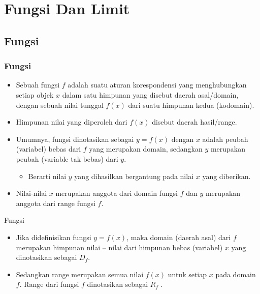 \documentclass[pdflatex,compress,mathserif]{beamer}
\begin{document}
\section{Fungsi Dan Limit}

	\subsection{Fungsi}
	
		\begin{frame}
			\frametitle{Fungsi}
			\begin{itemize}
				\item Sebuah fungsi $ f $ adalah suatu aturan korespondensi yang menghubungkan setiap objek $ x $ dalam satu himpunan yang disebut daerah asal/domain, dengan sebuah nilai tunggal $ f(x) $ dari suatu himpunan kedua (kodomain).
				\item Himpunan nilai yang diperoleh dari $ f(x) $ disebut daerah hasil/range.
				\item Umumnya, fungsi dinotasikan sebagai $ y = f(x) $ dengan $ x $ adalah peubah (variabel) bebas dari $ f $ yang merupakan domain, sedangkan $ y $ merupakan peubah (variable tak bebas) dari $ y $.
				\begin{itemize}
					\item Berarti nilai $ y $ yang dihasilkan bergantung pada nilai $ x $ yang diberikan.
				\end{itemize}
				\item Nilai-nilai $ x $ merupakan anggota dari domain fungsi $ f $ dan $ y $ merupakan anggota dari range fungsi $ f $.
			\end{itemize}
		\end{frame}
	
		\begin{frame}{Fungsi}
			\begin{itemize}
				\item Jika didefinisikan fungsi $ y = f(x) $, maka domain (daerah asal) dari $ f $ merupakan himpunan nilai – nilai dari himpunan bebas (variabel) $ x $ yang dinotasikan sebagai $ D_f $.
				\item Sedangkan range merupakan semua nilai $ f(x) $ untuk setiap $ x $ pada domain $ f $. Range dari fungsi $ f $ dinotasikan sebagai $ R_f $ .
			\end{itemize}
		\end{frame}
	
\end{document}

